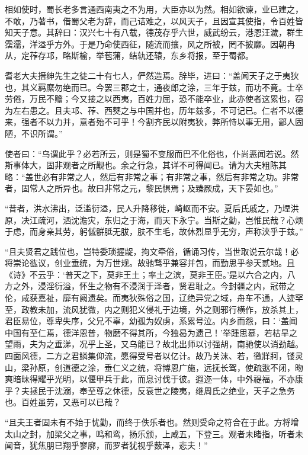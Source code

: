 \documentclass[12pt,UTF8]{ctexbook}
\begin{document}
相如使时，蜀长老多言通西南夷之不为用，大臣亦以为然。相如欲谏，业已建之，不敢，乃著书，借蜀父老为辞，而己诘难之，以风天子，且因宣其使指，令百姓皆知天子意。其辞曰：汉兴七十有八载，德茂存乎六世，威武纷云，港恩汪濊，群生霑濡，洋溢乎方外。于是乃命使西征，随流而攘，风之所被，罔不披靡。因朝冉从，定莋存邛，略斯榆，举苞蒲，结轨还辕，东乡将报，至于蜀都。



耆老大夫搢绅先生之徒二十有七人，俨然造焉。辞毕，进曰：“盖闻天子之于夷狄也，其义羁縻勿绝而已。今罢三郡之士，通夜郎之涂，三年于兹，而功不竟。士卒劳倦，万民不赡；今又接之以西夷，百姓力屈，恐不能卒业，此亦使者这累也，窃为左右患之。且夫邛、莋、西僰之与中国并也，历年兹多，不可记已。仁者不以德来，强者不以力并，意者殆不可乎！今割齐民以附夷狄，弊所恃以事无用，鄙人固陋，不识所谓。”



使者曰：“乌谓此乎？必若所云，则是蜀不变服而巴不化俗也，仆尚恶闻若说。然斯事体大，固非观者之所觏也。余之行急，其详不可得闻已。请为大夫粗陈其略：“盖世必有非常之人，然后有非常之事；有非常之事，然后有非常之功。非常者，固常人之所异也。故曰非常之元，黎民惧焉；及臻厥成，天下晏如也。”



“昔者，洪水沸出，泛滥衍溢，民人升降移徙，崎岖而不安。夏后氏戚之，乃堙洪原，决江疏河，洒沈澹灾，东归之于海，而天下永宁。当斯之勤，岂惟民哉？心烦于虑，而身亲其劳，躬傶骿胝无胈，肤不生毛，故休烈显乎无穷，声称浃乎于兹。”



“且夫贤君之践位也，岂特委琐握龊，拘文牵俗，循诵习传，当世取说云尔哉！必将崇论谹议，创业垂统，为万世规。故驰骛乎兼容并包，而勤思乎参天贰地。且《诗》不云乎：‘普天之下，莫非王土；率土之滨，莫非王臣。’是以六合之内，八方之外，浸淫衍溢，怀生之物有不浸润于泽者，贤君耻之。今封疆之内，冠带之伦，咸获嘉祉，靡有阙遗矣。而夷狄殊俗之国，辽绝异党之域，舟车不通，人迹罕至，政教未加，流风犹微，内之则犯义侵礼于边境，外之则邪行横作，放杀其上，君臣易位，尊卑失序，父兄不辜，幼孤为奴虏，系累号泣。内乡而怨，曰：‘盖闻中国有至仁焉，德洋恩普，物磨不得其所，今独曷为遗己！’举踵思慕，若枯旱之望雨，夫为之垂涕，况乎上圣，又乌能已？故北出师以讨强胡，南驰使以诮劲越。四面风德，二方之君鳞集仰流，愿得受号者以亿计。故乃关沫、若，徼牂牁，镂灵山，梁孙原，创道德之涂，垂仁义之统，将博恩广施，远抚长驾，使疏逖不闭，昒爽暗昧得耀乎光明，以偃甲兵于此，而息讨伐于彼。遐迩一体，中外禔福，不亦康乎？夫拯民于沈溺，奉至尊之休德，反衰世之陵夷，继周氏之绝业，天子之急务也。百姓虽劳，又恶可以已哉？



“且夫王者固未有不始于忧勤，而终于佚乐者也。然则受命之符合在于此。方将增太山之封，加梁父之事，鸣和鸾，扬乐颁，上咸五，下登三。观者未睹指，听者未闻音，犹焦朋已翔乎寥廓，而罗者犹视乎薮泽，悲夫！”
\end{document}
